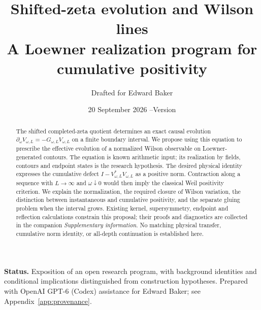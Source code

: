 \documentclass[11pt]{article}
\title{Shifted-zeta evolution and Wilson lines\\[3pt]
\large A Loewner realization program for cumulative positivity}
\author{Drafted for Edward Baker}
\date{20 September 2026 \quad--\quad Version \draftversion}
\begin{document}
\maketitle
\begin{abstract}
The shifted completed-zeta quotient determines an exact causal evolution
$\partial_\omega V_{\omega,L}=-G_{\omega,L}V_{\omega,L}$ on a finite
boundary interval. We propose using this equation to prescribe the
effective evolution of a normalized Wilson observable on
Loewner-generated contours. The equation is known arithmetic input;
its realization by fields, contours and endpoint states is the research
hypothesis. The desired physical identity expresses the cumulative
defect $I-V_{\omega,L}^*V_{\omega,L}$ as a positive norm. Contraction
along a sequence with $L\to\infty$ and $\omega\downarrow0$ would then
imply the classical Weil positivity criterion. We explain the
normalization, the required closure of Wilson variation, the distinction
between instantaneous and cumulative positivity, and the separate
gluing problem when the interval grows. Existing kernel, supersymmetry,
endpoint and reflection calculations constrain this proposal; their
proofs and diagnostics are collected in the companion
\emph{Supplementary information}. No matching physical transfer,
cumulative norm identity, or all-depth continuation is established here.
\end{abstract}
\noindent\textbf{Status.} Exposition of an open research program, with
background identities and conditional implications distinguished from
construction hypotheses. Prepared with OpenAI GPT-6 (Codex) assistance
for Edward Baker; see Appendix~\ref{app:provenance}.
\tableofcontents








\appendix


\end{document}

